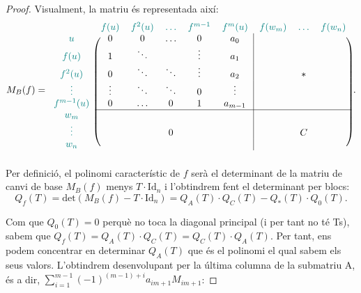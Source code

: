 \begin{proof}
Visualment, la matriu és representada així: 
\[ M_B(f)=
\begin{blockarray}{ccccccccc}
 & \textcolor{teal}{f(u)} & \textcolor{teal}{f^2(u)}& \textcolor{teal}{\dots}  & \textcolor{teal}{f^{m-1}} & \textcolor{teal}{f^m(u)} & \textcolor{teal}{f(w_m)} & \textcolor{teal}{\dots} & \textcolor{teal}{f(w_n)} \\
\begin{block}{c(ccccc|ccc)}
  \textcolor{teal}{u} &0&0&\dots &0& a_0 & & & \\
  \textcolor{teal}{f(u)} & 1 & \ddots& &\vdots & a_1 & & & \\
  \textcolor{teal}{f^2(u)} &0& \ddots & \ddots& \vdots& a_2 & & * & \\
  \textcolor{teal}{\vdots} & \vdots& \ddots & \ddots & 0& \vdots & & & \\
  \textcolor{teal}{f^{m-1}(u)} & 0& \dots& 0 & 1 & a_{m-1} & & & \\ \cline{2-9}
  \textcolor{teal}{w_m} & & & & & & & & \\
  \textcolor{teal}{\vdots} & & & 0 & & & & C & \\
  \textcolor{teal}{w_n} & & & & & & & & \\
\end{block}
\end{blockarray}\,.
 \]
Per definició, el polinomi característic de $f$ serà el determinant de la matriu de canvi de base $M_B(f)$ menys $T\cdot\text{Id}_n$ i l'obtindrem fent el determinant per blocs:
\[ Q_f(T) = \text{det} (M_B(f) - T \cdot \text{Id}_n) = Q_A(T)\cdot Q_C(T) - Q_*(T)\cdot Q_0(T). \]

Com que $Q_0(T) = 0$ perquè no toca la diagonal principal (i per tant no té Ts), sabem que $Q_f(T) = Q_A(T)\cdot Q_C(T) = Q_C(T)\cdot Q_A(T)$. Per tant, ens podem concentrar en determinar $Q_A(T)$ que és el polinomi el qual sabem els seus valors. L'obtindrem desenvolupant per la última columna de la submatriu A, és a dir, $\sum\limits_{i=1}^{m-1}(-1)^{(m-1) + i}a_{im+1}M_{im+1}$:


\end{proof}
